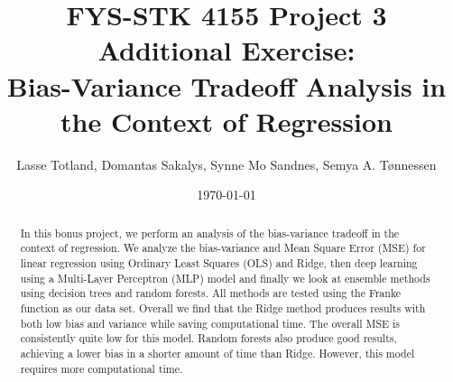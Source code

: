 \documentclass[reprint,english,notitlepage]{revtex4-1}  %
\begin{document}
\title{FYS-STK 4155 Project 3 
Additional Exercise: \\
Bias-Variance Tradeoff Analysis in the Context of Regression} \\ 
\large{}
\author{Lasse Totland, Domantas Sakalys, Synne Mo Sandnes, Semya A. Tønnessen}
\date{\today}      %
\noaffiliation                            %
\begin{abstract} 
In this bonus project, we perform an analysis of the bias-variance tradeoff in the context of regression. We analyze the bias-variance and Mean Square Error (MSE) for linear regression using Ordinary Least Squares (OLS) and Ridge, then deep learning using a Multi-Layer Perceptron (MLP) model and finally we look at ensemble methods using decision trees and random forests. All methods are tested using the Franke function as our data set. Overall we find that the Ridge method produces results with both low bias and variance while saving computational time. The overall MSE is consistently quite low for this model. Random forests also produce good results, achieving a lower bias in a shorter amount of time than Ridge. However, this model requires more computational time. 
\end{abstract}

\maketitle %
\end{document}
